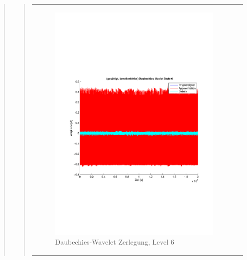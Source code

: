 \begin{quote}
\begin{quote}
\begin{center}
\begin{tabular}{ll}
\begin{minipage}{0.6\textwidth}
                    \end{minipage}
                    \begin{minipage}{0.6\textwidth}
    
                        \begin{figure}[H]
                            \label{fig:}
                            \includegraphics[scale=0.4, trim = 2cm 6cm 1cm
                            7.5cm,
                            clip]{./Bilder/Termin8/lamellenfehler_gesaettigt_Daubechies_Wavlet_lvl_6}
                            \caption{Daubechies-Wavelet Zerlegung, Level 6}
                        \end{figure}
                    \vspace{-1.5em}
    

\end{minipage}
\end{tabular}
\end{center}
\end{quote}
\end{quote}
